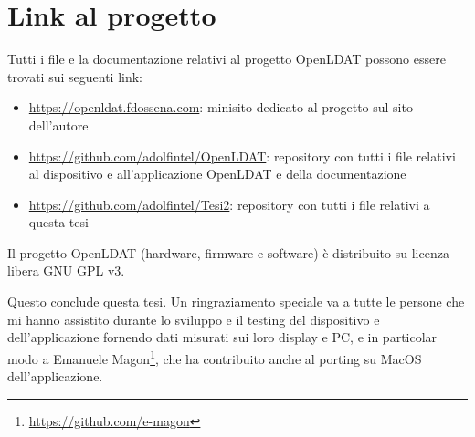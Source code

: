 \section{Link al progetto}
Tutti i file e la documentazione relativi al progetto OpenLDAT possono essere trovati sui seguenti link:\begin{itemize} %
	\item \url{https://openldat.fdossena.com}: minisito dedicato al progetto sul sito dell'autore
	\item \url{https://github.com/adolfintel/OpenLDAT}: repository con tutti i file relativi al dispositivo e all'applicazione OpenLDAT e della documentazione
	\item \url{https://github.com/adolfintel/Tesi2}: repository con tutti i file relativi a questa tesi
\end{itemize}

Il progetto OpenLDAT (hardware, firmware e software) è distribuito su licenza libera GNU GPL v3.

Questo conclude questa tesi. Un ringraziamento speciale va a tutte le persone che mi hanno assistito durante lo sviluppo e il testing del dispositivo e dell'applicazione fornendo dati misurati sui loro display e PC, e in particolar modo a Emanuele Magon\footnote{\url{https://github.com/e-magon}}, che ha contribuito anche al porting su MacOS dell'applicazione.

